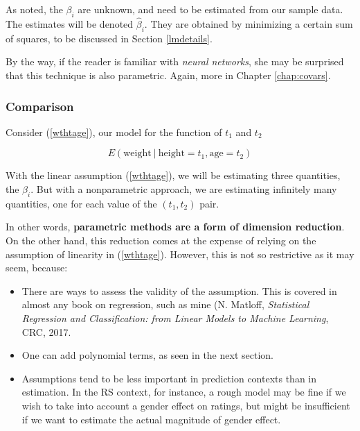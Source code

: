As noted, the $\beta_i$ are unknown, and need to be estimated
from our sample data.  The estimates will be denoted
$\widehat{\beta}_i$.  They are obtained by minimizing a certain sum of
squares, to be discussed in Section \ref{lmdetails}.

By the way, if the reader is familiar with
\textit{neural networks}, she may be surprised that this technique is
also parametric.  Again, more in Chapter \ref{chap:covars}.

\subsubsection{Comparison}

Consider (\ref{wthtage}), our model for the function of $t_1$ and $t_2$

\begin{equation}
E(\textrm{weight} ~|~ \textrm{height} = t_1, \textrm{age} = t_2)
\end{equation}


With the linear assumption (\ref{wthtage}), we will be estimating three
quantities, the $\beta_i$.  But with a nonparametric approach, we are
estimating infinitely many quantities, one for each value of the
$(t_1,t_2)$ pair.

In other words, \textbf{parametric methods are a form of dimension reduction}.
On the other hand, this reduction comes at the expense of relying on the
assumption of linearity in (\ref{wthtage}).  However, this is not so
restrictive as it may seem, because:

\begin{itemize}

\item There are ways to assess the validity of the assumption.  This is
covered in almost any book on regression, such as mine
(N. Matloff, \textit{Statistical Regression and Classification: from
Linear Models to Machine Learning}, CRC, 2017.

\item One can add polynomial terms, as seen in the next section.

\item Assumptions tend to be less important in prediction contexts than
in estimation.  In the RS context, for instance, a rough model may be
fine if we wish to take into account a gender effect on ratings, but
might be insufficient if we want to estimate the actual magnitude of
gender effect.

\end{itemize} 

